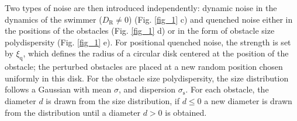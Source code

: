 \documentclass[aps,pre,twocolumn,showpacs,superscriptaddress,amsmath,amssymb,longbibliography]{revtex4-2}
\begin{document}
Two types of noise are then introduced independently: dynamic noise in the dynamics of the swimmer ($D_{\textrm{R}} \neq 0$) (Fig. \ref{fig_1} c) and quenched noise either in the positions of the obstacles (Fig. \ref{fig_1} d) or in the form of obstacle size polydispersity (Fig. \ref{fig_1} e). For positional quenched noise, the strength is set by $\xi_{\textrm{q}}$, which defines the radius of a circular disk centered at the position of the obstacle; the perturbed obstacles are placed at a new random position chosen uniformly in this disk. For the obstacle size polydispersity, the size distribution follows a Gaussian with mean $\sigma$, and dispersion $\sigma_{\textrm{s}}$. For each obstacle, the diameter $d$ is drawn from the size distribution, if $d \leq 0$ a new diameter is drawn from the distribution until a diameter $d > 0$ is obtained.
\end{document}
